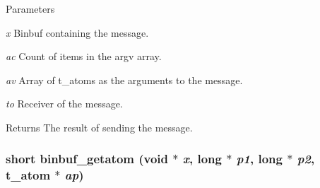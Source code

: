 \begin{DoxyParams}{Parameters}
\item[{\em x}]Binbuf containing the message. \item[{\em ac}]Count of items in the argv array. \item[{\em av}]Array of t\_\-atoms as the arguments to the message. \item[{\em to}]Receiver of the message.\end{DoxyParams}
\begin{DoxyReturn}{Returns}
The result of sending the message. 
\end{DoxyReturn}
\hypertarget{group__binbuf_ga0eccee2d50ae561c625cc97238f1e21a}{
\subsubsection[{binbuf\_\-getatom}]{\setlength{\rightskip}{0pt plus 5cm}short binbuf\_\-getatom (void $\ast$ {\em x}, \/  long $\ast$ {\em p1}, \/  long $\ast$ {\em p2}, \/  {\bf t\_\-atom} $\ast$ {\em ap})}}
\label{group__binbuf_ga0eccee2d50ae561c625cc97238f1e21a}


